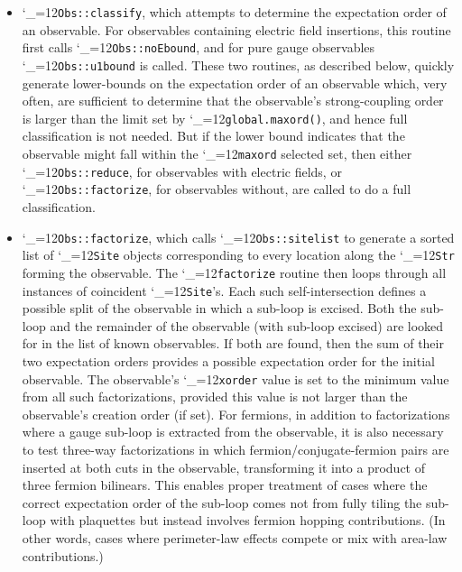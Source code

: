 \documentclass [12pt]{article}
\makeatletter
\renewcommand{\tt}{\begingroup\catcode`_=12\def\_{\string_}\tt@}
\newcommand{\tt@}[1]{\texttt{#1}\endgroup}
\makeatother
\begin{document}
\begin{itemize}
    \item
	\tt{Obs::classify}, which attempts to determine
	the expectation order of an observable.
	For observables containing electric field insertions,
	this routine first calls \tt{Obs::noEbound},
	and for pure gauge observables
	\tt{Obs::u1bound} is called.
	These two routines, as described below, quickly
	generate lower-bounds on the expectation order of
	an observable which, very often, are sufficient to
	determine that the observable's strong-coupling order
	is larger than the limit set by \tt{global.maxord()},
	and hence full classification is not needed.
	But if the lower bound indicates that the observable
	might fall within the \tt{maxord} selected set, then
	either \tt{Obs::reduce}, for observables with electric
	fields, or \tt{Obs::factorize}, for observables without,
	are called to do a full classification.

    \item
	\tt{Obs::factorize}, which calls \tt{Obs::sitelist}
	to generate a sorted list of \tt{Site} objects
	corresponding to every location along the \tt{Str}
	forming the observable.
	The \tt{factorize} routine then loops through
	all instances of coincident \tt{Site}'s.
	Each such self-intersection defines a possible split of
	the observable in which a sub-loop is excised.
	Both the sub-loop and the remainder of the observable
	(with sub-loop excised) are looked for in the list
	of known observables.
	If both are found, then the sum of their two
	expectation orders provides a possible expectation
	order for the initial observable.
	The observable's \tt{xorder} value is set to
	the minimum value from all such factorizations,
	provided this value is not larger than the
	observable's creation order (if set).
	For fermions, in addition to factorizations where
	a gauge sub-loop is extracted from the observable,
	it is also necessary to test three-way factorizations
	in which fermion/conjugate-fermion pairs are inserted
	at both cuts in the observable, transforming it into
	a product of three fermion bilinears.  This enables
	proper treatment of cases where the correct
	expectation order of the sub-loop comes not from
	fully tiling the sub-loop with plaquettes but
	instead involves fermion hopping contributions.
	(In other words, cases where perimeter-law effects
	compete or mix with area-law contributions.)


\end{itemize}
\end{document}

